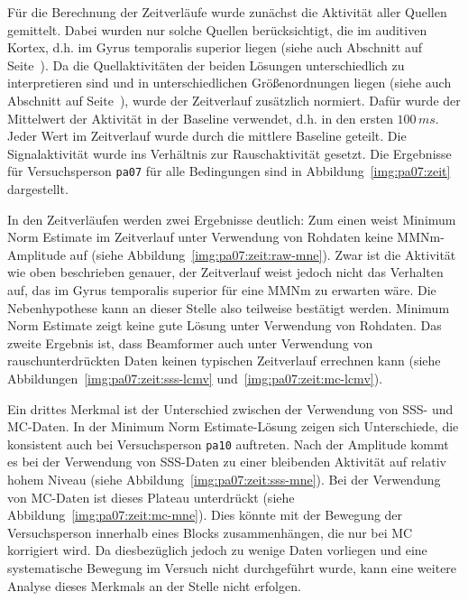 \documentclass[doc,a4paper,12pt]{apa6}
\makeatletter
\DeclareRobustCommand*{\nameref}[1]{%
      \glqq{\myorg@nameref{#1}}\grqq%
    }%
\makeatother
\begin{document}
Für die Berechnung der Zeitverläufe wurde zunächst die Aktivität aller Quellen gemittelt. Dabei wurden nur solche Quellen berücksichtigt, die im auditiven Kortex, d.h. im Gyrus temporalis superior liegen (siehe auch Abschnitt \nameref{sec:audicort} auf Seite~\pageref{sec:audicort}). Da die Quellaktivitäten der beiden Lösungen unterschiedlich zu interpretieren sind und in unterschiedlichen Größenordnungen liegen (siehe auch Abschnitt \nameref{sec:amplitud} auf Seite~\pageref{sec:amplitud}), wurde der Zeitverlauf zusätzlich normiert. Dafür wurde der Mittelwert der Aktivität in der Baseline verwendet, d.h. in den ersten $100\,ms$. Jeder Wert im Zeitverlauf wurde durch die mittlere Baseline geteilt. Die Signalaktivität wurde ins Verhältnis zur Rauschaktivität gesetzt. Die Ergebnisse für Versuchsperson \texttt{pa07} für alle Bedingungen sind in Abbildung~\ref{img:pa07:zeit} dargestellt.

In den Zeitverläufen werden zwei Ergebnisse deutlich: Zum einen weist Minimum Norm Estimate im Zeitverlauf unter Verwendung von Rohdaten keine MMNm-Amplitude auf (siehe Abbildung~\ref{img:pa07:zeit:raw-mne}). Zwar ist die Aktivität wie oben beschrieben genauer, der Zeitverlauf weist jedoch nicht das Verhalten auf, das im Gyrus temporalis superior für eine MMNm zu erwarten wäre. Die Nebenhypothese kann an dieser Stelle also teilweise bestätigt werden. Minimum Norm Estimate zeigt keine gute Lösung unter Verwendung von Rohdaten. Das zweite Ergebnis ist, dass Beamformer auch unter Verwendung von rauschunterdrückten Daten keinen typischen Zeitverlauf errechnen kann (siehe Abbildungen~\ref{img:pa07:zeit:sss-lcmv} und~\ref{img:pa07:zeit:mc-lcmv}).

Ein drittes Merkmal ist der Unterschied zwischen der Verwendung von SSS- und MC-Daten. In der Minimum Norm Estimate-Lösung zeigen sich Unterschiede, die konsistent auch bei Versuchsperson \texttt{pa10} auftreten. Nach der Amplitude kommt es bei der Verwendung von SSS-Daten zu einer bleibenden Aktivität auf relativ hohem Niveau (siehe Abbildung~\ref{img:pa07:zeit:sss-mne}). Bei der Verwendung von MC-Daten ist dieses Plateau unterdrückt (siehe Abbildung~\ref{img:pa07:zeit:mc-mne}). Dies könnte mit der Bewegung der Versuchsperson innerhalb eines Blocks zusammenhängen, die nur bei MC korrigiert wird. Da diesbezüglich jedoch zu wenige Daten vorliegen und eine systematische Bewegung im Versuch nicht durchgeführt wurde, kann eine weitere Analyse dieses Merkmals an der Stelle nicht erfolgen.

\end{document}
